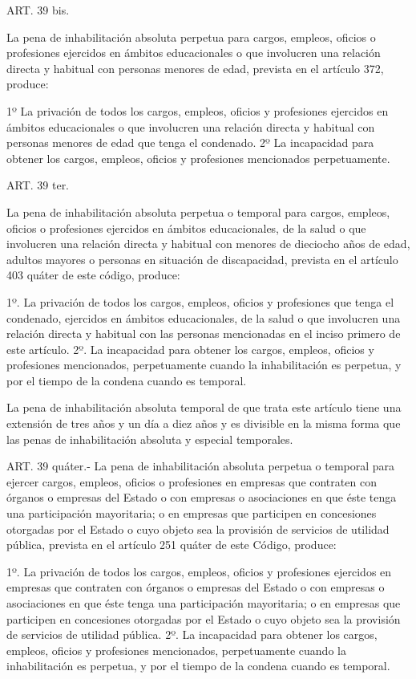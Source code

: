     ART. 39 bis.

    La pena de inhabilitación absoluta perpetua para cargos, empleos, oficios o profesiones ejercidos en ámbitos educacionales o que involucren una relación directa y habitual con personas menores de edad, prevista en el artículo 372, produce:
     
    1º La privación de todos los cargos, empleos, oficios y profesiones ejercidos en ámbitos educacionales o que involucren una relación directa y habitual con personas menores de edad que tenga el condenado.
    2º La incapacidad para obtener los cargos, empleos, oficios y profesiones mencionados perpetuamente.


    ART. 39 ter.

    La pena de inhabilitación absoluta perpetua o temporal para cargos, empleos, oficios o profesiones ejercidos en ámbitos educacionales, de la salud o que involucren una relación directa y habitual con menores de dieciocho años de edad, adultos mayores o personas en situación de discapacidad, prevista en el artículo 403 quáter de este código, produce:

    1º. La privación de todos los cargos, empleos, oficios y profesiones que tenga el condenado, ejercidos en ámbitos educacionales, de la salud o que involucren una relación directa y habitual con las personas mencionadas en el inciso primero de este artículo.
    2º. La incapacidad para obtener los cargos, empleos, oficios y profesiones mencionados, perpetuamente cuando la inhabilitación es perpetua, y por el tiempo de la condena cuando es temporal.

    La pena de inhabilitación absoluta temporal de que trata este artículo tiene una extensión de tres años y un día a diez años y es divisible en la misma forma que las penas de inhabilitación absoluta y especial temporales.




    ART. 39 quáter.- La pena de inhabilitación absoluta perpetua o temporal para ejercer cargos, empleos, oficios o profesiones en empresas que contraten con órganos o empresas del Estado o con empresas o asociaciones en que éste tenga una participación mayoritaria; o en empresas que participen en concesiones otorgadas por el Estado o cuyo objeto sea la provisión de servicios de utilidad pública, prevista en el artículo 251 quáter de este Código, produce:
     
    1º. La privación de todos los cargos, empleos, oficios y profesiones ejercidos en empresas que contraten con órganos o empresas del Estado o con empresas o asociaciones en que éste tenga una participación mayoritaria; o en empresas que participen en concesiones otorgadas por el Estado o cuyo objeto sea la provisión de servicios de utilidad pública.
    2º. La incapacidad para obtener los cargos, empleos, oficios y profesiones mencionados, perpetuamente cuando la inhabilitación es perpetua, y por el tiempo de la condena cuando es temporal.
     
